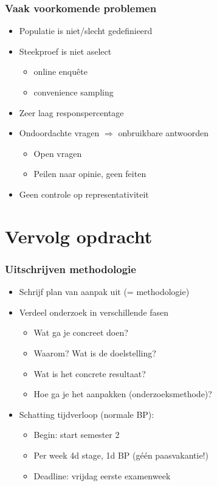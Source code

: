 \documentclass[aspectratio=169]{beamer}
\begin{document}
\begin{frame}
  \frametitle{Vaak voorkomende problemen}

  \begin{itemize}
    \item Populatie is niet/slecht gedefinieerd
    \item Steekproef is niet aselect
          \begin{itemize}
            \item online enquête
            \item convenience sampling
          \end{itemize}
    \item Zeer laag responspercentage
    \item Ondoordachte vragen $\Rightarrow$ onbruikbare antwoorden
          \begin{itemize}
            \item Open vragen
            \item Peilen naar opinie, geen feiten
          \end{itemize}
    \item Geen controle op representativiteit
  \end{itemize}

\end{frame}

\section{Vervolg opdracht}

\begin{frame}
  \frametitle{Uitschrijven methodologie}

  \begin{itemize}
    \item Schrijf plan van aanpak uit (= methodologie)
    \item Verdeel onderzoek in verschillende fasen
          \begin{itemize}
            \item Wat ga je concreet doen?
            \item Waarom? Wat is de doelstelling?
            \item Wat is het concrete resultaat?
            \item Hoe ga je het aanpakken (onderzoeksmethode)?
          \end{itemize}
    \item Schatting tijdverloop (normale BP):
          \begin{itemize}
            \item Begin: start semester 2
            \item Per week 4d stage, 1d BP (géén paasvakantie!)
            \item Deadline: vrijdag eerste examenweek
          \end{itemize}
  \end{itemize}

\end{frame}
\end{document}
